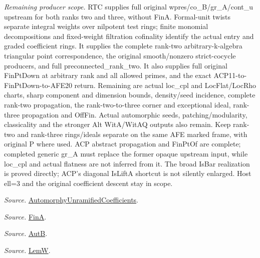 \documentclass[11pt,a4paper]{article}
\numberwithin{equation}{section}
\theoremstyle{remark}\newtheorem{remark}[theorem]{Remark}
\begin{document}
\emph{Remaining producer scope.} RTC supplies full original wpres/co\_\allowbreak B/gr\_\allowbreak A/cont\_\allowbreak u upstream for both ranks two and three, without FinA. Formal-unit twists separate integral weights over nilpotent test rings; finite monomial decompositions and fixed-weight filtration cofinality identify the actual entry and graded coefficient rings. It supplies the complete rank-two arbitrary-k-algebra triangular point correspondence, the original smooth/nonzero strict-cocycle producers, and full preconnected\_\allowbreak rank\_\allowbreak two. It also supplies full original FinPtDown at arbitrary rank and all allowed primes, and the exact ACP11-to-FinPtDown-to-AFE20 return. Remaining are actual loc\_\allowbreak cpl and LocFlat/LocRho charts, sharp component and dimension bounds, density/seed incidence, complete rank-two propagation, the rank-two-to-three corner and exceptional ideal, rank-three propagation and OffFin. Actual automorphic seeds, patching/modularity, classicality and the stronger Alt WitA/WitAQ outputs also remain. Keep rank-two and rank-three rings/ideals separate on the same AFE marked frame, with original P where used. ACP abstract propagation and FinPtOf are complete; completed generic gr\_\allowbreak A must replace the former opaque upstream input, while loc\_\allowbreak cpl and actual flatness are not inferred from it. The broad IsBar realization is proved directly; ACP’s diagonal IsLiftA shortcut is not silently enlarged. Host ell=3 and the original coefficient descent stay in scope.

\emph{Source.} \href{https://github.com/CocoSgt/riemann-hypothesis-lean/blob/7cbf7a0c32fca1badf05931879a37c3f8a2b03b4/src/Development/AutomorphicArithmetic/AutomorphicVarieties/AutomorphicCases/AutomorphyUnramifiedCoefficients.lean#L24-L27}{AutomorphyUnramifiedCoefficients}.

\emph{Source.} \href{https://github.com/CocoSgt/riemann-hypothesis-lean/blob/7cbf7a0c32fca1badf05931879a37c3f8a2b03b4/src/Development/AutomorphicArithmetic/AutomorphicVarieties/AutomorphicCases/AutomorphyUnramifiedCoefficients.lean#L12-L13}{FinA}.

\emph{Source.} \href{https://github.com/CocoSgt/riemann-hypothesis-lean/blob/7cbf7a0c32fca1badf05931879a37c3f8a2b03b4/src/Development/AutomorphicArithmetic/AutomorphicVarieties/AutomorphicCases/AutomorphyUnramifiedCoefficients.lean#L15-L17}{AutB}.

\emph{Source.} \href{https://github.com/CocoSgt/riemann-hypothesis-lean/blob/7cbf7a0c32fca1badf05931879a37c3f8a2b03b4/src/Development/AutomorphicArithmetic/AutomorphicVarieties/AutomorphicCases/AutomorphyUnramifiedCoefficients.lean#L19-L22}{LemW}.
\end{document}
